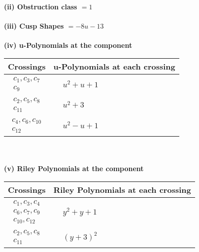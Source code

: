 \documentclass[1p]{elsarticle_modified}
\theoremstyle{definition}
\begin{document}
\flushleft \textbf{(ii) Obstruction class $= 1$}\\~\\
\flushleft \textbf{(iii) Cusp Shapes $= -8 u-13$}\\~\\
\newpage\renewcommand{\arraystretch}{1}
\flushleft \textbf{(iv) u-Polynomials at the component}\newline \\
\begin{tabular}{m{50pt}|m{274pt}}
Crossings & \hspace{64pt}u-Polynomials at each crossing \\
\hline $$\begin{aligned}c_{1},c_{3},c_{7}\\c_{9}\end{aligned}$$&$\begin{aligned}
&u^2+u+1
\end{aligned}$\\
\hline $$\begin{aligned}c_{2},c_{5},c_{8}\\c_{11}\end{aligned}$$&$\begin{aligned}
&u^2+3
\end{aligned}$\\
\hline $$\begin{aligned}c_{4},c_{6},c_{10}\\c_{12}\end{aligned}$$&$\begin{aligned}
&u^2- u+1
\end{aligned}$\\
\hline
\end{tabular}\\~\\
\newpage\renewcommand{\arraystretch}{1}
\flushleft \textbf{(v) Riley Polynomials at the component}\newline \\
\begin{tabular}{m{50pt}|m{274pt}}
Crossings & \hspace{64pt}Riley Polynomials at each crossing \\
\hline $$\begin{aligned}c_{1},c_{3},c_{4}\\c_{6},c_{7},c_{9}\\c_{10},c_{12}\end{aligned}$$&$\begin{aligned}
&y^2+y+1
\end{aligned}$\\
\hline $$\begin{aligned}c_{2},c_{5},c_{8}\\c_{11}\end{aligned}$$&$\begin{aligned}
&(y+3)^2
\end{aligned}$\\
\hline
\end{tabular}\\~\\
\end{document}
